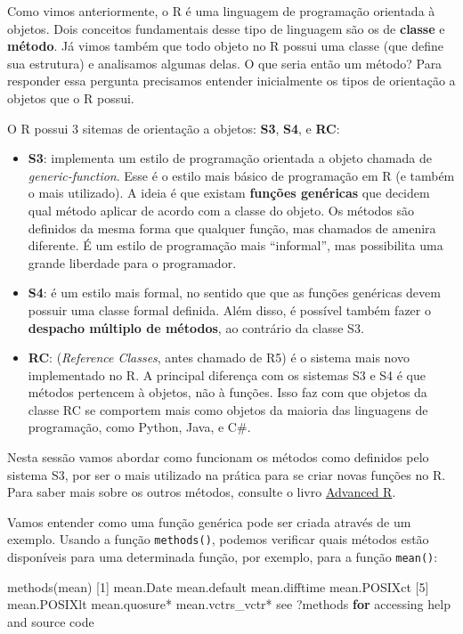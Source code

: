 \documentclass[
  10pt,
  a4paper]{book}
\newenvironment{Shaded}{\begin{snugshade}}{\end{snugshade}}
\newcommand{\ControlFlowTok}[1]{\textcolor[rgb]{0.13,0.29,0.53}{\textbf{#1}}}
\newcommand{\DecValTok}[1]{\textcolor[rgb]{0.00,0.00,0.81}{#1}}
\newcommand{\FunctionTok}[1]{\textcolor[rgb]{0.00,0.00,0.00}{#1}}
\newcommand{\NormalTok}[1]{#1}
\newcommand{\SpecialCharTok}[1]{\textcolor[rgb]{0.00,0.00,0.00}{#1}}
\newcommand{\StringTok}[1]{\textcolor[rgb]{0.31,0.60,0.02}{#1}}
\providecommand{\tightlist}{%
  \setlength{\itemsep}{0pt}\setlength{\parskip}{0pt}}
\begin{document}
Como vimos anteriormente, o R é uma linguagem de programação orientada à
objetos. Dois conceitos fundamentais desse tipo de linguagem são os de
\textbf{classe} e \textbf{método}. Já vimos também que todo objeto no R possui uma
classe (que define sua estrutura) e analisamos algumas delas. O que
seria então um método? Para responder essa pergunta precisamos entender
inicialmente os tipos de orientação a objetos que o R possui.

O R possui 3 sitemas de orientação a objetos: \textbf{S3}, \textbf{S4}, e \textbf{RC}:

\begin{itemize}
\tightlist
\item
  \textbf{S3}: implementa um estilo de programação orientada a objeto chamada
  de \emph{generic-function}. Esse é o estilo mais básico de programação em R
  (e também o mais utilizado). A ideia é que existam \textbf{funções
  genéricas} que decidem qual método aplicar de acordo com a classe do
  objeto. Os métodos são definidos da mesma forma que qualquer função,
  mas chamados de amenira diferente. É um estilo de programação mais
  ``informal'', mas possibilita uma grande liberdade para o programador.
\item
  \textbf{S4}: é um estilo mais formal, no sentido que que as funções
  genéricas devem possuir uma classe formal definida. Além disso, é
  possível também fazer o \textbf{despacho múltiplo de métodos}, ao contrário
  da classe S3.
\item
  \textbf{RC}: (\emph{Reference Classes}, antes chamado de R5) é o sistema mais
  novo implementado no R. A principal diferença com os sistemas S3 e
  S4 é que métodos pertencem à objetos, não à funções. Isso faz com que
  objetos da classe RC se comportem mais como objetos da maioria das
  linguagens de programação, como Python, Java, e C\#.
\end{itemize}

Nesta sessão vamos abordar como funcionam os métodos como definidos pelo
sistema S3, por ser o mais utilizado na prática para se criar novas
funções no R. Para saber mais sobre os outros métodos, consulte o livro
\href{http://adv-r.had.co.nz/OO-essentials.html}{Advanced R}.

Vamos entender como uma função genérica pode ser criada através de um
exemplo. Usando a função \texttt{methods()}, podemos verificar quais métodos
estão disponíveis para uma determinada função, por exemplo, para a
função \texttt{mean()}:

\begin{Shaded}
\begin{Highlighting}[]
\FunctionTok{methods}\NormalTok{(mean)}
\NormalTok{[}\DecValTok{1}\NormalTok{] mean.Date        mean.default     mean.difftime    mean.POSIXct    }
\NormalTok{[}\DecValTok{5}\NormalTok{] mean.POSIXlt     mean.quosure}\SpecialCharTok{*}\NormalTok{    mean.vctrs\_vctr}\SpecialCharTok{*}
\NormalTok{see }\StringTok{\textquotesingle{}?methods\textquotesingle{}} \ControlFlowTok{for}\NormalTok{ accessing help and source code}
\end{Highlighting}
\end{Shaded}
\end{document}
